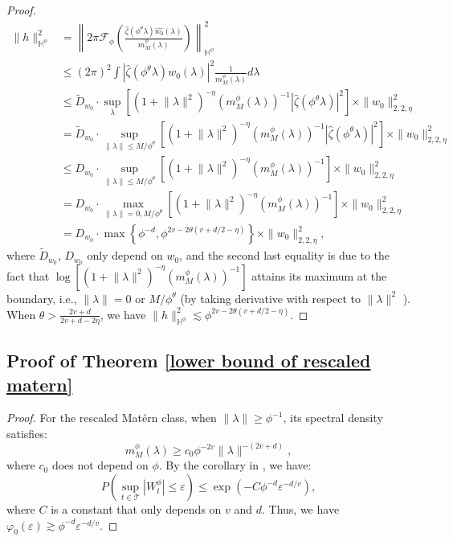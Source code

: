 \documentclass[ejs,noshowframe]{imsart}
\theoremstyle{plain}
\theoremstyle{definition}
\theoremstyle{remark}
\begin{document}
\begin{appendix}
\begin{proof}
\begin{equation}
\begin{split}
\|h\|_{\mathbb{H}^{\phi}}^2  & =  \left\| 2 \pi \mathcal{F}_{\phi}\left( \frac{\hat{\zeta}(\phi^{\theta} \lambda)\hat{w_0}(\lambda)}{m_M^{\phi}(\lambda)}\right)\right\|_{\mathbb{H}^{\phi}}^2 \\
& \leq (2\pi)^2  \int|\hat{\zeta}(\phi^{\theta} \lambda)\hat{w_0}(\lambda)|^2 \frac{1}{m^{\phi}_M(\lambda)} d\lambda \\ 
&\leq \tilde{D}_{w_0} \cdot  \sup_\lambda\left[(1+{\|\lambda\|^2})^{-\eta} \left(m^{\phi}_M(\lambda)\right)^{-1} |\hat{\zeta}(\phi^{\theta} \lambda)|^2\right] \times \|w_0\|^2_{2,2,\eta}\\
& =  \tilde{D}_{w_0} \cdot \sup_{\|\lambda\| \leq M/\phi^{\theta}}\left[(1+{\|\lambda\|^2})^{-\eta}\left(m^{\phi}_M(\lambda)\right)^{-1} |\hat{\zeta}(\phi^{\theta}\lambda)|^2\right] \times \|w_0\|^2_{2,2,\eta}\\
&\leq D_{w_0} \cdot \sup_{\|\lambda\| \leq M/\phi^{\theta}}\left[(1+{\|\lambda\|^2})^{-\eta}\left(m^{\phi}_M(\lambda)\right)^{-1} \right] \times \|w_0\|^2_{2,2,\eta}\\
&= D_{w_0} \cdot\max_{\|\lambda\|=0,M/\phi^{\theta}}\left[(1+{\|\lambda\|^2})^{-\eta}\left(m^{\phi}_M(\lambda)\right)^{-1} \right] \times \|w_0\|^2_{2,2,\eta} \\
&= D_{w_0} \cdot \max \left\{\phi^{-d}, \phi^{2v-2\theta(v+d/2-\eta)}\right\}\times \|w_0\|^2_{2,2,\eta},
\end{split}
\end{equation}
where $\tilde{D}_{w_0}$, $D_{w_0}$ only depend on $w_0$, and the  second last equality is due to the fact that $\log[(1+{\|\lambda\|^2})^{-\eta}\left(m^{\phi}_M(\lambda)\right)^{-1} ]$  attains its maximum at the boundary, i.e., $\|\lambda\|=0$ or $M/\phi^{\theta}$ (by taking derivative with respect to $\|\lambda\|^2$ ).  When $\theta > \frac{2v+d}{2v+d-2 \eta}$, we have $\|h\|_{\mathbb{H}^{\phi}}^2 \lesssim  \phi^{2v-2\theta(v+d/2-\eta)}$.
\end{proof}

\subsection{Proof of Theorem \ref{lower bound of rescaled matern}}
\begin{proof}
For the rescaled Mat\'ern class,  when $\|\lambda\| \ge \phi^{-1}$, its spectral density satisfies:
$$
m^{\phi}_M(\lambda) \ge c_0 \phi^{-2v} \|\lambda\|^{-(2v+d)},
$$
where $c_0$ does not depend on $\phi$.
By  the corollary in  \cite{lifshits1987small}, we have:
$$
P\left(\sup_{t \in \mathcal{T}} |W_t^\phi| \le \varepsilon\right) \le \exp(-C \phi^{-d} \varepsilon^{-d/v}),
$$
where $C$ is a constant that only depends on $v$ and $d$. Thus, we have $\varphi_0(\varepsilon) \gtrsim \phi^{-d} \varepsilon^{-d/v}$.


\end{proof}
\end{appendix}
\end{document}
